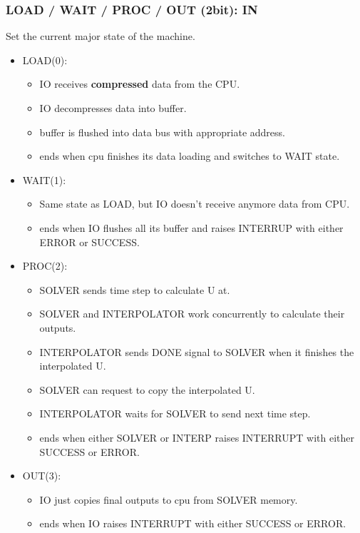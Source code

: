\documentclass[12pt]{report}
\begin{document}
\subsubsection{LOAD / WAIT / PROC / OUT (2bit): IN}
Set the current major state of the machine.
\begin{itemize}
    \item LOAD(0):
    \begin{itemize}
        \item IO receives \textbf{compressed} data from the CPU.
        \item IO decompresses data into buffer.
        \item buffer is flushed into data bus with appropriate address.
        \item ends when cpu finishes its data loading and switches to {WAIT} state.
    \end{itemize}
    \item WAIT(1):
    \begin{itemize}
        \item Same state as {LOAD}, but IO doesn't receive anymore data from CPU.
        \item ends when IO flushes all its buffer and raises {INTERRUP} with either {ERROR} or {SUCCESS}.
    \end{itemize}
    \item PROC(2):
    \begin{itemize}
        \item SOLVER sends time step to calculate {U} at.
        \item SOLVER and INTERPOLATOR work concurrently to calculate their outputs.
        \item INTERPOLATOR sends {DONE} signal to SOLVER when it finishes the interpolated U.
        \item SOLVER can request to copy the interpolated {U}.
        \item INTERPOLATOR waits for SOLVER to send next time step.
        \item ends when either SOLVER or INTERP raises INTERRUPT with either {SUCCESS} or {ERROR}.
    \end{itemize}
    \item OUT(3):
    \begin{itemize}
        \item IO just copies final outputs to cpu from SOLVER memory.
        \item ends when IO raises INTERRUPT with either {SUCCESS} or {ERROR}.
    \end{itemize}
\end{itemize}
\end{document}
